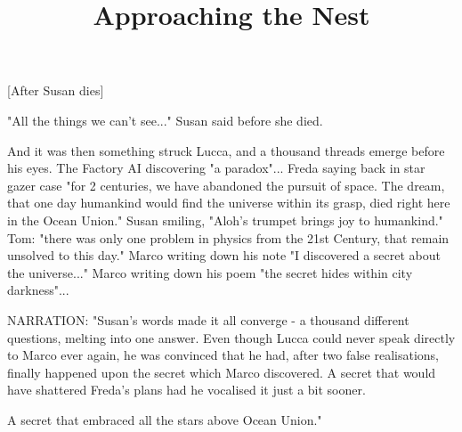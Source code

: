 \documentclass[11pt]{article}
\begin{document}
\ttfamily
\title{Approaching the Nest}
\maketitle

[After Susan dies]


"All the things we can't see..." Susan said before she died.

And it was then something struck Lucca, and a thousand threads emerge before his eyes. The Factory AI discovering "a paradox"... Freda saying back in star gazer case "for 2 centuries, we have abandoned the pursuit of space. The dream, that one day humankind would find the universe within its grasp, died right here in the Ocean Union." Susan smiling, "Aloh's trumpet brings joy to humankind." Tom: "there was only one problem in physics from the 21st Century, that remain unsolved to this day." Marco writing down his note "I discovered a secret about the universe..." Marco writing down his poem "the secret hides within city darkness"...

NARRATION: "Susan's words made it all converge - a thousand different questions, melting into one answer. Even though Lucca could never speak directly to Marco ever again, he was convinced that he had, after two false realisations, finally happened upon the secret which Marco discovered. A secret that would have shattered Freda's plans had he vocalised it just a bit sooner. 

A secret that embraced all the stars above Ocean Union."
\end{document}
